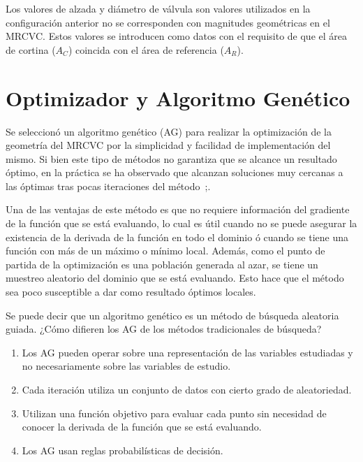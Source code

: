 Los valores de alzada y diámetro de válvula son valores utilizados en la
configuración anterior no se corresponden con magnitudes geométricas en el
MRCVC.
%
Estos valores se introducen como datos con el requisito de que el área de
cortina ($A_{C}$) coincida con el área de referencia ($A_{R}$).



\section{Optimizador y Algoritmo Genético}
%
Se seleccionó un algoritmo genético (AG) para realizar la optimización de la
geometría del MRCVC por la simplicidad y facilidad de implementación del mismo.
%
Si bien este tipo de métodos no garantiza que se alcance un resultado óptimo,
en la práctica se ha observado que alcanzan soluciones muy cercanas a las
óptimas tras pocas iteraciones del método~\parencite{goldberg};\parencite{shi}.

Una de las ventajas de este método es que no requiere información del gradiente
de la función que se está evaluando, lo cual es útil cuando no se puede asegurar
la existencia de la derivada de la función en todo el dominio ó cuando se tiene
una función con más de un máximo o mínimo local.
%
Además, como el punto de partida de la optimización es una población generada al
azar, se tiene un muestreo aleatorio del dominio que se está evaluando.
%
Esto hace que el método sea poco susceptible a dar como resultado óptimos
locales.

Se puede decir que un algoritmo genético es un método de búsqueda aleatoria
guiada.
%
¿Cómo difieren los AG de los métodos tradicionales de búsqueda?
%
\begin{enumerate}
  \item Los AG pueden operar sobre una representación de las variables estudiadas y
no necesariamente sobre las variables de estudio.
  \item Cada iteración utiliza un conjunto de datos con cierto grado de
aleatoriedad.
  \item Utilizan una función objetivo para evaluar cada punto sin necesidad de
conocer la derivada de la función que se está evaluando.
  \item Los AG usan reglas probabilísticas de decisión.
\end{enumerate}


